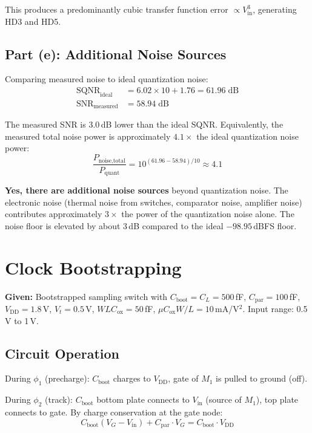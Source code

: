 \documentclass{article}
\begin{document}
This produces a predominantly cubic transfer function error $\propto V_\text{in}^3$, generating HD3 and HD5.

\subsection{Part (e): Additional Noise Sources}

Comparing measured noise to ideal quantization noise:
\begin{align}
    \text{SQNR}_\text{ideal} &= 6.02 \times 10 + 1.76 = 61.96\;\text{dB} \\
    \text{SNR}_\text{measured} &= 58.94\;\text{dB}
\end{align}

The measured SNR is 3.0\,dB lower than the ideal SQNR. Equivalently, the measured total noise power is approximately $4.1\times$ the ideal quantization noise power:
\begin{equation}
    \frac{P_\text{noise,total}}{P_\text{quant}} = 10^{(61.96 - 58.94)/10} \approx 4.1
\end{equation}

\textbf{Yes, there are additional noise sources} beyond quantization noise. The electronic noise (thermal noise from switches, comparator noise, amplifier noise) contributes approximately $3\times$ the power of the quantization noise alone. The noise floor is elevated by about 3\,dB compared to the ideal $-98.95$\,dBFS floor.

\section{Clock Bootstrapping}

\textbf{Given:} Bootstrapped sampling switch with $C_\text{boot} = C_L = 500$\,fF, $C_\text{par} = 100$\,fF, $V_\text{DD} = 1.8$\,V, $V_t = 0.5$\,V, $WLC_\text{ox} = 50$\,fF, $\mu C_\text{ox} W/L = 10$\,mA/V$^2$. Input range: 0.5\,V to 1\,V.

\subsection{Circuit Operation}

During $\phi_1$ (precharge): $C_\text{boot}$ charges to $V_\text{DD}$, gate of $M_1$ is pulled to ground (off).

During $\phi_2$ (track): $C_\text{boot}$ bottom plate connects to $V_\text{in}$ (source of $M_1$), top plate connects to gate. By charge conservation at the gate node:
\begin{equation}
    C_\text{boot}(V_G - V_\text{in}) + C_\text{par} \cdot V_G = C_\text{boot} \cdot V_\text{DD}
\end{equation}
\end{document}
